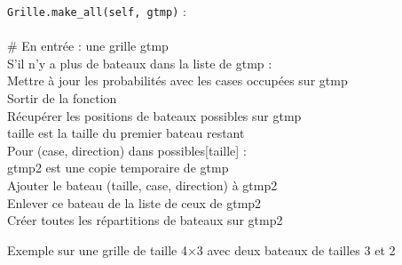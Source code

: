 {
\begin{frame}[allowframebreaks]
\texttt{Grille.make\_all(self, gtmp)} :\\~\\

\# En entrée : une grille gtmp\\
S'il n'y a plus de bateaux dans la liste de gtmp :\\
Mettre à jour les probabilités avec les cases occupées sur gtmp\\
Sortir de la fonction\\
Récupérer les positions de bateaux possibles sur gtmp\\
taille est la taille du premier bateau restant\\
Pour (case, direction) dans possibles[taille] :\\
gtmp2 est une copie temporaire de gtmp\\
Ajouter le bateau (taille, case, direction) à gtmp2\\
Enlever ce bateau de la liste de ceux de gtmp2\\
Créer toutes les répartitions de bateaux sur gtmp2\\
\end{frame}
}

\begin{frame}
Exemple sur une grille de taille 4×3 avec deux bateaux de tailles 3 et 2
\end{frame}

